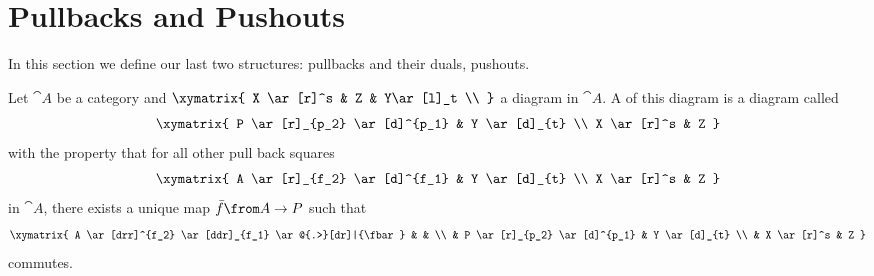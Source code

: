 \section*{Pullbacks and Pushouts}

In this section we define our last two structures: pullbacks and their duals, pushouts.

\begin{definition}[Pullback]
  \label{def:pullback}
  Let $\cat{A}$ be a category and
  $ \xymatrix{
    X \ar[r]^s & Z & Y\ar[l]_t \\
  } $
  a diagram in $\cat{A}$.
  A  of this diagram is a diagram called 
  \[ \xymatrix{
    P \ar[r]_{p_2} \ar[d]^{p_1} & Y \ar[d]_{t} \\
    X \ar[r]^s & Z
  } \]
  with the property that for all other pull back squares
  \[ \xymatrix{
    A \ar[r]_{f_2} \ar[d]^{f_1} & Y \ar[d]_{t} \\
    X \ar[r]^s & Z
  } \]
  in $\cat{A}$, there exists a unique map $\fbar\from A \to P$ such that
  \[ \xymatrix{
    A \ar[drr]^{f_2} \ar[ddr]_{f_1} \ar@{.>}[dr]|{\fbar} & & \\
    & P \ar[r]_{p_2} \ar[d]^{p_1} & Y \ar[d]_{t} \\
    & X \ar[r]^s & Z
  } \]
  commutes.
\end{definition}


